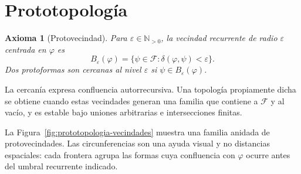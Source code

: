 \documentclass[11pt]{article}
\numberwithin{equation}{section}
\theoremstyle{prism}
\newtheorem{axioma}{Axioma}
\newcommand{\F}{\mathcal{F}}
\newcommand{\N}{\mathbb{N}}
\begin{document}
\FloatBarrier
\section{Prototopología}

\begin{axioma}[Protovecindad]
Para $\varepsilon\in\N_{>0}$, la vecindad recurrente de radio $\varepsilon$
centrada en $\varphi$ es
\begin{equation}
  B_{\varepsilon}(\varphi)
  =\bigl\{\psi\in\F:\delta(\varphi,\psi)<\varepsilon\bigr\}.
  \label{eq:vecindad}
\end{equation}
Dos protoformas son cercanas al nivel $\varepsilon$ si
$\psi\in B_{\varepsilon}(\varphi)$.
\end{axioma}

La cercanía expresa confluencia autorrecursiva. Una topología propiamente dicha
se obtiene cuando estas vecindades generan una familia que contiene a $\F$ y al
vacío, y es estable bajo uniones arbitrarias e intersecciones finitas.

La Figura~\ref{fig:prototopologia-vecindades} muestra una familia anidada de
protovecindades. Las circunferencias son una ayuda visual y no distancias
espaciales: cada frontera agrupa las formas cuya confluencia con $\varphi$
ocurre antes del umbral recurrente indicado.
\end{document}
